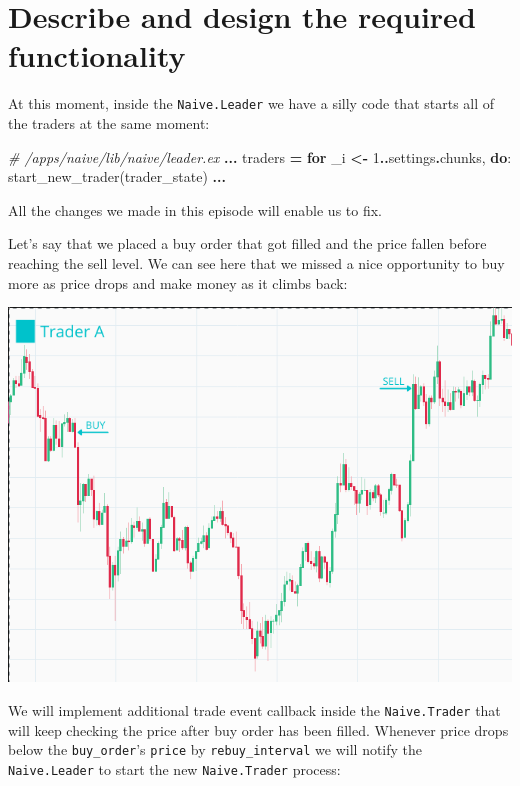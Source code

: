 \documentclass[
  oneside]{book}
\newenvironment{Shaded}{\begin{snugshade}}{\end{snugshade}}
\newcommand{\CommentTok}[1]{\textcolor[rgb]{0.56,0.35,0.01}{\textit{#1}}}
\newcommand{\DecValTok}[1]{\textcolor[rgb]{0.00,0.00,0.81}{#1}}
\newcommand{\KeywordTok}[1]{\textcolor[rgb]{0.13,0.29,0.53}{\textbf{#1}}}
\newcommand{\NormalTok}[1]{#1}
\newcommand{\OperatorTok}[1]{\textcolor[rgb]{0.81,0.36,0.00}{\textbf{#1}}}
\begin{document}
\hypertarget{describe-and-design-the-required-functionality}{%
\section{Describe and design the required functionality}\label{describe-and-design-the-required-functionality}}

At this moment, inside the \texttt{Naive.Leader} we have a silly code that
starts all of the traders at the same moment:

\begin{Shaded}
\begin{Highlighting}[]
    \CommentTok{\# /apps/naive/lib/naive/leader.ex}
    \OperatorTok{...}
\NormalTok{    traders }\OperatorTok{=}
      \KeywordTok{for}\NormalTok{ \_i }\OperatorTok{\textless{}{-}} \DecValTok{1}\OperatorTok{..}\NormalTok{settings}\OperatorTok{.}\NormalTok{chunks,}
          \KeywordTok{do}\NormalTok{: start\_new\_trader(trader\_state)}
    \OperatorTok{...}
\end{Highlighting}
\end{Shaded}

All the changes we made in this episode will enable us to fix.

Let's say that we placed a buy order that got filled and the price fallen before reaching the sell level. We can see here that we missed a nice opportunity to buy more as price drops and make money as it climbs back:

\includegraphics{images/chapter_09_01_single_trader.png}

We will implement additional trade event callback inside the \texttt{Naive.Trader} that will keep checking the price after buy order has been filled. Whenever price drops below the \texttt{buy\_order}'s \texttt{price} by \texttt{rebuy\_interval} we will notify the \texttt{Naive.Leader} to start the new \texttt{Naive.Trader} process:
\end{document}
